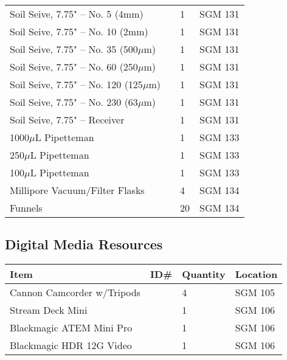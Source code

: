 \documentclass[12pt]{../SOP4_alpha}\usepackage[]{graphicx}\usepackage[]{color}
\begin{document}
\begin{tabular}{|l|l|l|l|}
Soil Seive, 7.75" -- No. 5 (4mm) && 1  & SGM 131 \\
Soil Seive, 7.75" -- No. 10 (2mm) && 1  & SGM 131 \\
Soil Seive, 7.75" -- No. 35 (500$\mu$m) && 1  & SGM 131 \\
Soil Seive, 7.75" -- No. 60 (250$\mu$m) && 1  & SGM 131 \\
Soil Seive, 7.75" -- No. 120 (125$\mu$m) && 1  & SGM 131 \\
Soil Seive, 7.75" -- No. 230 (63$\mu$m) && 1  & SGM 131 \\
Soil Seive, 7.75" -- Receiver      && 1  & SGM 131 \\
1000$\mu$L Pipetteman       && 1 & SGM 133\\
250$\mu$L Pipetteman        && 1 & SGM 133\\
100$\mu$L Pipetteman        && 1& SGM 133\\
Millipore Vacuum/Filter Flasks && 4 & SGM 134 \\
Funnels                     && 20 & SGM 134\\
\hline
\end{tabular}

\subsection{Digital Media Resources}
\begin{tabular}{|l|l|l|l|}
\hline
Item      & ID\#  & Quantity & Location \\ \hline
Cannon Camcorder w/Tripods   && 4 & SGM 105 \\
Stream Deck Mini && 1 & SGM 106 \\
Blackmagic ATEM Mini Pro && 1 & SGM 106\\
Blackmagic HDR 12G Video && 1 & SGM 106\\
\hline
\end{tabular}
\end{document}
